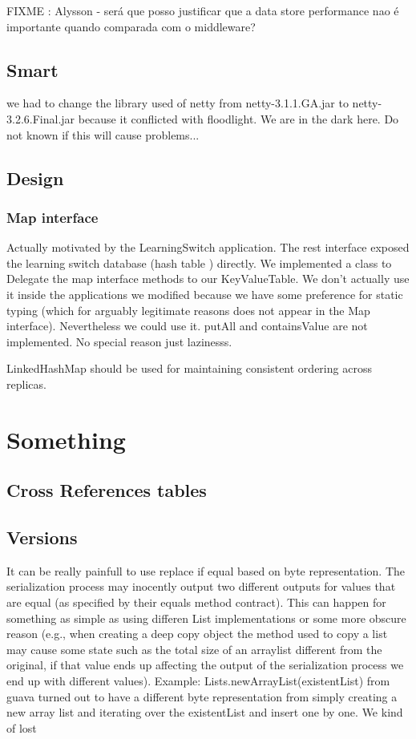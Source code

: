 FIXME : Alysson - será que posso justificar que a data store
performance nao é importante quando comparada com o middleware? 

\subsection{Smart}
we had to change the library used of netty from netty-3.1.1.GA.jar to
netty-3.2.6.Final.jar because it conflicted with floodlight. We are in
the dark here. Do not known if this will cause problems... 

\subsection{Design}

\subsubsection{Map interface} 
Actually motivated by the LearningSwitch application. The rest interface exposed the learning switch database (hash table ) directly. We implemented a class to Delegate the map interface methods to our KeyValueTable. We don't actually use it inside the applications we modified because we have some preference for static typing (which for arguably legitimate reasons does not appear in the Map interface). Nevertheless we could use it. putAll and containsValue are not implemented. No special reason just lazinesss.  

LinkedHashMap should be used for maintaining consistent ordering
across replicas. 

\section{Something}
\label{sec:heimdall:datastore:functionalities}
\subsection{Cross References tables}
\label{sec.datastore.cross.references}
\subsection{Versions}
It can be really painfull to use replace if equal based on byte
representation. The serialization process may inocently output two
different outputs for values that are equal (as specified by their
equals method contract).  This can happen for something as simple as
using differen List implementations or some more obscure reason (e.g.,
when creating a deep copy object the method used to copy a list may
cause some state such as the total size of an arraylist different from
the original, if that value ends up affecting the output of the
serialization process we end up with different values). 
Example: Lists.newArrayList(existentList) from guava turned out to
have a different byte representation from  simply creating a new array
list and iterating over the existentList and insert one by one. We
kind of lost 

